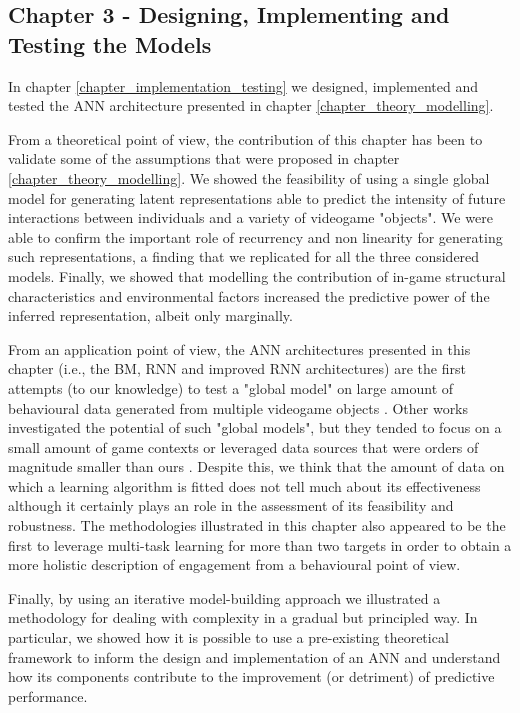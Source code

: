 \subsection{Chapter 3 - Designing, Implementing and Testing the Models }
\label{discussion_chapter_three}
In chapter \ref{chapter_implementation_testing} we designed, implemented and tested the ANN architecture presented in chapter \ref{chapter_theory_modelling}.

From a theoretical point of view, the contribution of this chapter has been to validate some of the assumptions that were proposed in chapter \ref{chapter_theory_modelling}. We showed the feasibility of using a single global model for generating latent representations able to predict the intensity of future interactions between individuals and a variety of videogame "objects". We were able to confirm the important role of recurrency and non linearity for generating such representations, a finding that we replicated for all the three considered models. Finally, we showed that modelling the contribution of in-game structural characteristics and environmental factors increased the predictive power of the inferred representation, albeit only marginally. 

From an application point of view, the ANN architectures presented in this chapter (i.e., the BM, RNN and improved RNN architectures) are the first attempts (to our knowledge) to test a "global model" on large amount of behavioural data generated from multiple videogame objects \cite{perianez2016churn, liu2018semi,kristensen2019combining,liu2019micro, roohi2020predicting}. Other works investigated the potential of such "global models", but they tended to focus on a small amount of game contexts \cite{zhao2020multi} or leveraged data sources that were orders of magnitude smaller than ours \cite{liu2019micro, zhao2020multi}. Despite this, we think that the amount of data on which a learning algorithm is fitted does not tell much about its effectiveness although it certainly plays an role in the assessment of its feasibility and robustness. The methodologies illustrated in this chapter also appeared to be the first to leverage multi-task learning for more than two targets \cite{liu2019micro, zhao2020multi}in order to obtain a more holistic description of engagement from a behavioural point of view.

Finally, by using an iterative model-building approach we illustrated a methodology for dealing with complexity in a gradual but principled way. In particular, we showed how it is possible to use a pre-existing theoretical framework to inform the design and implementation of an ANN and understand how its components contribute to the improvement (or detriment) of predictive performance.

